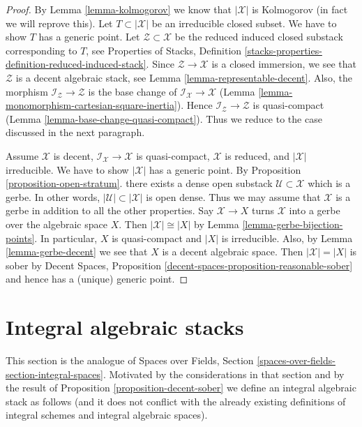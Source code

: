 \documentclass{stacks-project}
\theoremstyle{plain}
\theoremstyle{definition}
\theoremstyle{remark}
\numberwithin{equation}{subsection}
\begin{document}
\begin{proof}
By Lemma \ref{lemma-kolmogorov} we know that $|\mathcal{X}|$ is Kolmogorov
(in fact we will reprove this).
Let $T \subset |\mathcal{X}|$ be an irreducible closed subset.
We have to show $T$ has a generic point.
Let $\mathcal{Z} \subset \mathcal{X}$ be the reduced induced
closed substack corresponding to $T$, see Properties of Stacks, Definition
\ref{stacks-properties-definition-reduced-induced-stack}.
Since $\mathcal{Z} \to \mathcal{X}$ is a closed immersion,
we see that $\mathcal{Z}$ is a decent algebraic stack, see
Lemma \ref{lemma-representable-decent}.
Also, the morphism $\mathcal{I}_\mathcal{Z} \to \mathcal{Z}$
is the base change of $\mathcal{I}_\mathcal{X} \to \mathcal{X}$
(Lemma \ref{lemma-monomorphism-cartesian-square-inertia}).
Hence $\mathcal{I}_\mathcal{Z} \to \mathcal{Z}$ is quasi-compact
(Lemma \ref{lemma-base-change-quasi-compact}).
Thus we reduce to the case discussed in the next paragraph.

\medskip\noindent
Assume $\mathcal{X}$ is decent,
$\mathcal{I}_\mathcal{X} \to \mathcal{X}$ is quasi-compact,
$\mathcal{X}$ is reduced, and $|\mathcal{X}|$ irreducible.
We have to show $|\mathcal{X}|$ has a generic point.
By Proposition \ref{proposition-open-stratum}.
there exists a dense open substack $\mathcal{U} \subset \mathcal{X}$
which is a gerbe. In other words, $|\mathcal{U}| \subset |\mathcal{X}|$
is open dense. Thus we may assume that $\mathcal{X}$ is a gerbe
in addition to all the other properties.
Say $\mathcal{X} \to X$ turns $\mathcal{X}$ into a gerbe over the
algebraic space $X$. Then $|\mathcal{X}| \cong |X|$ by
Lemma \ref{lemma-gerbe-bijection-points}.
In particular, $X$ is quasi-compact and $|X|$ is irreducible.
Also, by Lemma \ref{lemma-gerbe-decent}
we see that $X$ is a decent algebraic space.
Then $|\mathcal{X}| = |X|$ is sober by
Decent Spaces, Proposition \ref{decent-spaces-proposition-reasonable-sober}
and hence has a (unique) generic point.
\end{proof}






\section{Integral algebraic stacks}
\label{section-integral-stacks}

\noindent
This section is the analogue of Spaces over Fields, Section
\ref{spaces-over-fields-section-integral-spaces}.
Motivated by the considerations in that section and by the result
of Proposition \ref{proposition-decent-sober} we define an
integral algebraic stack as follows (and it does not conflict
with the already existing definitions of integral schemes and
integral algebraic spaces).
\end{document}
